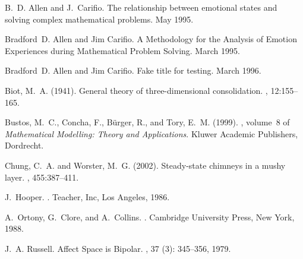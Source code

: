\documentclass{article}
\begin{document}
\begin{thebibliography}{}

B.~D. Allen and J.~Carifio.
\newblock The relationship between emotional states and solving complex
  mathematical problems.
\newblock May 1995{}.

Bradford~D. Allen and Jim Carifio.
\newblock A {M}ethodology for the {A}nalysis of {E}motion {E}xperiences during
  {M}athematical {P}roblem {S}olving.
\newblock March 1995{}.

Bradford~D. Allen and Jim Carifio.
\newblock Fake title for testing.
\newblock March 1996.

Biot, M.~A. (1941).
\newblock General theory of three-dimensional consolidation.
, 12:155--165.

Bustos, M.~C., Concha, F., B\"{u}rger, R., and Tory, E.~M. (1999).
, volume~8 of {\em Mathematical Modelling: Theory and
  Applications}.
\newblock Kluwer Academic Publishers, Dordrecht.

Chung, C.~A. and Worster, M.~G. (2002).
\newblock Steady-state chimneys in a mushy layer.
, 455:387--411.

J.~Hooper.
.
\newblock Teacher, Inc, Los Angeles, 1986.

A.~Ortony, G.~Clore, and A.~Collins.
.
\newblock Cambridge University Press, New York, 1988.

J.~A. Russell.
\newblock Affect {S}pace is {B}ipolar.
, 37
  (3): 345--356, 1979.
\end{thebibliography}
\end{document}
